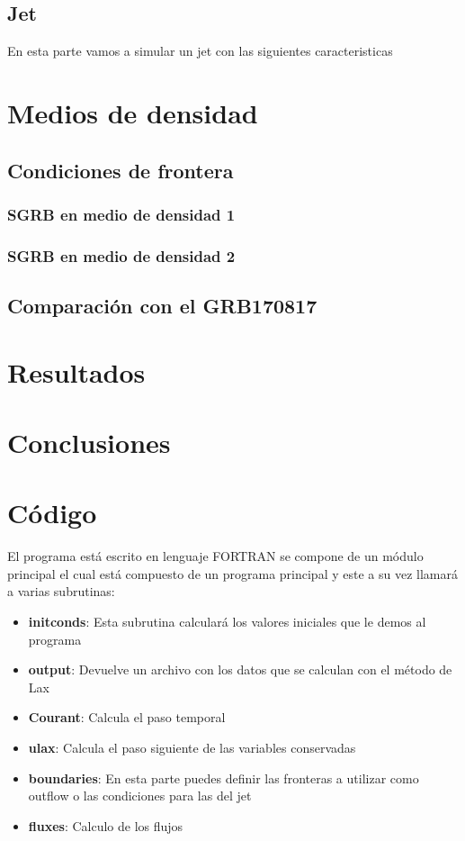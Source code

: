 \documentclass[12pt,a4paper]{book}
\begin{document}
\section{Jet}

En esta parte vamos a simular un jet con las siguientes caracteristicas
\chapter{Medios de densidad}

\section{Condiciones de frontera}
\subsection{SGRB en medio de densidad 1}
\subsection{SGRB en medio de densidad 2}

\section{Comparación con el GRB170817}

\chapter{Resultados}
\chapter{Conclusiones}



\appendix
\chapter{Código}\label{aped.A}

El programa está escrito en lenguaje FORTRAN se compone de un módulo principal el cual está compuesto de un programa principal y este a su vez llamará a varias subrutinas:
\begin{itemize}
\item \textbf{initconds}: Esta subrutina calculará los valores iniciales que le demos al programa

\item \textbf{output}: Devuelve un archivo con los datos que se calculan con el método de Lax

\item \textbf{Courant}: Calcula el paso temporal

\item \textbf{ulax}: Calcula el paso siguiente de las variables conservadas

\item \textbf{boundaries}: En esta parte puedes definir las fronteras a utilizar como outflow o las condiciones para las del jet

\item \textbf{fluxes}: Calculo de los flujos
\end{itemize}
\end{document}

